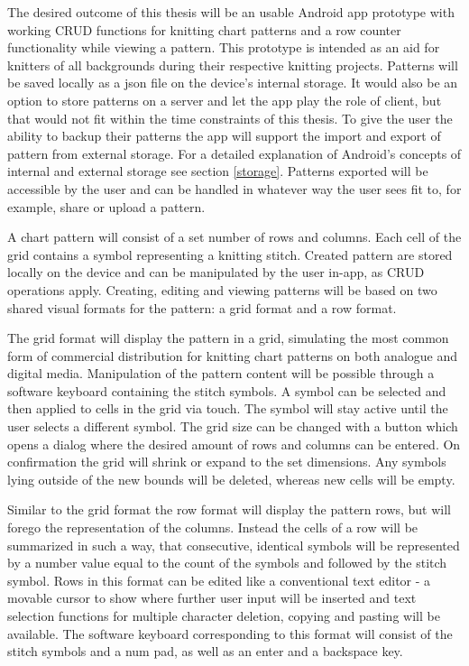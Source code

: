 The desired outcome of this thesis will be an usable Android app prototype with working CRUD functions for knitting chart patterns and a row counter functionality while viewing a pattern. This prototype is intended as an aid for knitters of all backgrounds during their respective knitting projects. Patterns will be saved locally as a \gls{json} file on the device's internal storage. It would also be an option to store patterns on a server and let the app play the role of client, but that would not fit within the time constraints of this thesis. To give the user the ability to backup their patterns the app will support the import and export of pattern from external storage. For a detailed explanation of Android's concepts of internal and external storage see section \ref{storage}. Patterns exported will be accessible by the user and can be handled in whatever way the user sees fit to, for example, share or upload a pattern.

A chart pattern will consist of a set number of rows and columns. Each cell of the grid contains a symbol representing a knitting stitch. Created pattern are stored locally on the device and can be manipulated by the user in-app, as CRUD operations apply. Creating, editing and viewing patterns will be based on two shared visual formats for the pattern: a grid format and a row format.

The grid format will display the pattern in a grid, simulating the most common form of commercial distribution for knitting chart patterns on both analogue and digital media. Manipulation of the pattern content will be possible through a software keyboard containing the stitch symbols. A symbol can be selected and then applied to cells in the grid via touch. The symbol will stay active until the user selects a different symbol. The grid size can be changed with a button which opens a dialog where the desired amount of rows and columns can be entered. On confirmation the grid will shrink or expand to the set dimensions. Any symbols lying outside of the new bounds will be deleted, whereas new cells will be empty.

Similar to the grid format the row format will display the pattern rows, but will forego the representation of the columns. Instead the cells of a row will be summarized in such a way, that consecutive, identical symbols will be represented  by a number value equal to the count of the symbols and followed by the stitch symbol. Rows in this format can be edited like a conventional text editor - a movable cursor to show where further user input will be inserted and text selection functions for multiple character deletion, copying and pasting will be available. The software keyboard corresponding to this format will consist of the stitch symbols and a num pad, as well as an enter and a backspace key.

